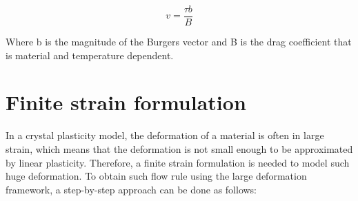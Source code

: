 \documentclass[12pt]{article}
\begin{document}
\begin{equation}
    v = \frac{\tau b}{B}
\end{equation}

Where b is the magnitude of the Burgers vector and B is the drag coefficient that is material and temperature
dependent. 


\section{Finite strain formulation}
\hspace{2em}In a crystal plasticity model, the deformation of a material is often in large strain,
which means that the deformation is not small enough to be approximated by linear plasticity. Therefore, a finite strain
formulation is needed to model such huge deformation. To obtain such flow rule using the large deformation framework, a step-by-step
approach can be done as follows:
\end{document}
